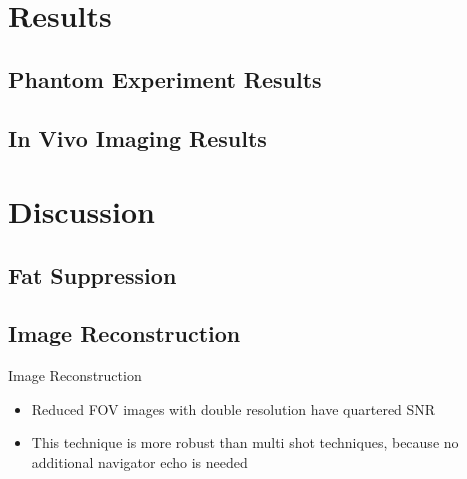 \documentclass{beamer}
\begin{document}
\section{Results}
\subsection{Phantom Experiment Results}
\subsection{In Vivo Imaging Results}

\section{Discussion}

%

\subsection{Fat Suppression}
\subsection{Image Reconstruction}

\begin{frame}{Image Reconstruction}
\begin{itemize}
	\item Reduced FOV images with double resolution have quartered SNR
	\item This technique is more robust than multi shot techniques, because no additional navigator echo is needed
\end{itemize}
\end{frame}
\end{document}
